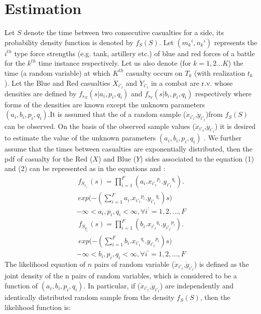 \documentclass[]{article}
\begin{document}

\clearpage
\newpage
\section{Estimation}
Let $S$ denote the time between two consecutive casualties for a side, its probability density function is denoted by $f_S(S)$. Let $({m_k}^i,{n_k}^i)$  represents the ${i}^{th}$ type force strengths (e.g. tank, artillery etc.) of blue and red forces of a battle for the ${k}^{th}$ time instance respectively. Let us also denote (for $k=1,2\dots K$) the time (a random variable) at which $K^{th}$ casualty occurs on $T_k$ (with realization $t_k$). Let the Blue and Red casualties $\Dot{X}_{i'_t}$ and $\Dot{Y}_{i'_t}$  in a combat are r.v. whose densities are defined by $f_{s_X}(s | a_i,p_i,q_i)$  and  $f_{s_Y}(s | b_i,p_i,q_i)$ respectively where forms of the densities are known except the unknown parameters \\$(a_i,b_i,p_i,q_i)$.It is assumed that the   of a random sample  ($\Dot{x}_{i'_t}$,$\Dot{y}_{i'_t}$)from $f_S(S)$ can be observed. On the basis of the observed sample values ($\Dot{x}_{i'_t}$,$\Dot{y}_{i'_t}$) it is desired to estimate the value of the unknown parameters $(a_i,b_i,p_i,q_i)$ . We further assume that the times between casualties are exponentially distributed, then the pdf  of casualty for the Red ($X$) and Blue ($Y$) sides associated to the equation (1) and (2) can be represented as in the equations  and :
\begin{multline*}
     f_{S_{{x}_{i^{'}}}}(s)=
     {\prod_{i=1}^{F}}(a_i.{x_{i'_t}}^{p_i}.{y_{i'_t}}^{q_i}).
     \\exp(-{(\sum_{i=1}^{F}a_i.{x_{i'_t}}^{p_i}.{y_{i'_t}}^{q_i})s)} \nonumber
     \end{multline*}
\begin{equation}\label{e3}
    -\infty<a_i,p_i,q_i<\infty,  \forall{i^{'}=1,2,\dots,F}
\end{equation}
\begin{multline*}\label{e4}
     f_{S_{{y}_{i^{'}}}}(s)=
     {\prod_{i=1}^{F}}(b_i.{x_{i'_t}}^{q_i}.{y_{i'_t}}^{p_i}).
     \\exp(-{(\sum_{i=1}^{F}b_i.{x_{i'_t}}^{q_i}.{y_{i'_t}}^{p_i})s)} \nonumber
     \end{multline*}
\begin{equation}\label{e5}
    -\infty<b_i,p_i,q_i<\infty,  \forall{i^{'}=1,2,\dots,F}
\end{equation}
The likelihood equation of $n$ pairs of random variable ($\Dot{x}_{i'_t}$,$\Dot{y}_{i'_t}$) is defined as the joint density of the n pairs of random variables, which is considered to be a function of $(a_i,b_i,p_i,q_i)$. In particular, if ($\Dot{x}_{i'_t}$,$\Dot{y}_{i'_t}$) are independently and identically distributed random sample from the density $f_S(S)$, then the likelihood function is:  
 
\end{document}
